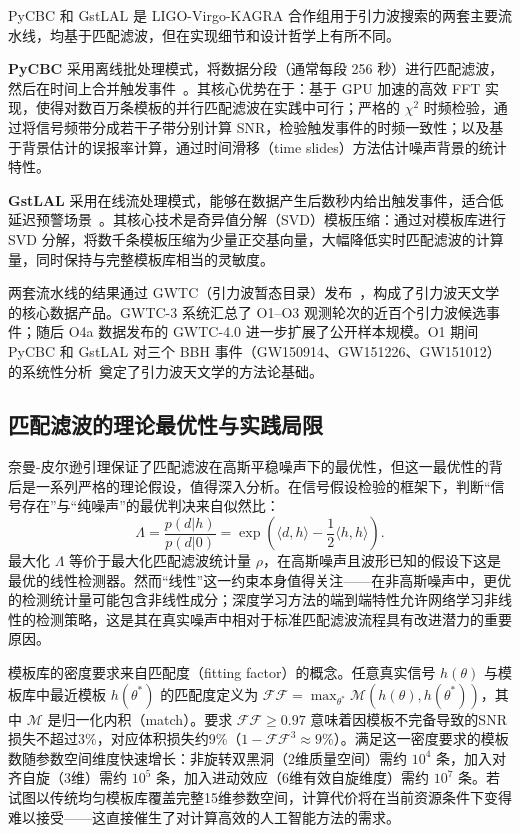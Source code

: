 PyCBC 和 GstLAL 是 LIGO-Virgo-KAGRA 合作组用于引力波搜索的两套主要流水线，均基于匹配滤波，但在实现细节和设计哲学上有所不同。

\textbf{PyCBC} 采用离线批处理模式，将数据分段（通常每段 256 秒）进行匹配滤波，然后在时间上合并触发事件~\cite{Usman2016PyCBCsearch,Nitz2021PyCBC}。其核心优势在于：基于 GPU 加速的高效 FFT 实现，使得对数百万条模板的并行匹配滤波在实践中可行；严格的 $\chi^2$ 时频检验，通过将信号频带分成若干子带分别计算 SNR，检验触发事件的时频一致性；以及基于背景估计的误报率计算，通过时间滑移（time slides）方法估计噪声背景的统计特性。

\textbf{GstLAL} 采用在线流处理模式，能够在数据产生后数秒内给出触发事件，适合低延迟预警场景~\cite{Messick2017GstLAL,Cannon2012GstLAL}。其核心技术是奇异值分解（SVD）模板压缩：通过对模板库进行 SVD 分解，将数千条模板压缩为少量正交基向量，大幅降低实时匹配滤波的计算量，同时保持与完整模板库相当的灵敏度。

两套流水线的结果通过 GWTC（引力波暂态目录）发布~\cite{Abbott2021GWTC3,Abac2025GWTC4}，构成了引力波天文学的核心数据产品。GWTC-3 系统汇总了 O1--O3 观测轮次的近百个引力波候选事件；随后 O4a 数据发布的 GWTC-4.0 进一步扩展了公开样本规模。O1 期间 PyCBC 和 GstLAL 对三个 BBH 事件（GW150914、GW151226、GW151012）的系统性分析~\cite{Abbott2016O1BBH}奠定了引力波天文学的方法论基础。

\subsection{匹配滤波的理论最优性与实践局限}

奈曼-皮尔逊引理保证了匹配滤波在高斯平稳噪声下的最优性，但这一最优性的背后是一系列严格的理论假设，值得深入分析。在信号假设检验的框架下，判断“信号存在”与“纯噪声”的最优判决来自似然比：
\begin{equation}
\Lambda = \frac{p(d|h)}{p(d|0)} = \exp\!\left(\langle d, h\rangle - \frac{1}{2}\langle h, h\rangle\right).
\end{equation}
最大化 $\Lambda$ 等价于最大化匹配滤波统计量 $\rho$，在高斯噪声且波形已知的假设下这是最优的线性检测器。然而“线性”这一约束本身值得关注——在非高斯噪声中，更优的检测统计量可能包含非线性成分；深度学习方法的端到端特性允许网络学习非线性的检测策略，这是其在真实噪声中相对于标准匹配滤波流程具有改进潜力的重要原因。

模板库的密度要求来自匹配度（fitting factor）的概念。任意真实信号 $h(\theta)$ 与模板库中最近模板 $h(\theta^*)$ 的匹配度定义为 $\mathcal{FF} = \max_{\theta^*}\mathcal{M}(h(\theta), h(\theta^*))$，其中 $\mathcal{M}$ 是归一化内积（match）。要求 $\mathcal{FF} \geq 0.97$ 意味着因模板不完备导致的SNR损失不超过3\%，对应体积损失约9\%（$1 - \mathcal{FF}^3 \approx 9\%$）。满足这一密度要求的模板数随参数空间维度快速增长：非旋转双黑洞（2维质量空间）需约 $10^4$ 条，加入对齐自旋（3维）需约 $10^5$ 条，加入进动效应（6维有效自旋维度）需约 $10^7$ 条。若试图以传统均匀模板库覆盖完整15维参数空间，计算代价将在当前资源条件下变得难以接受——这直接催生了对计算高效的人工智能方法的需求。

